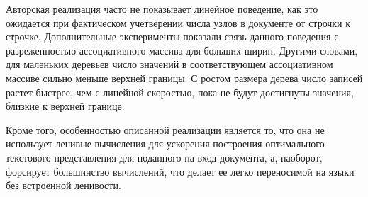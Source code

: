Авторская реализация часто не показывает линейное поведение, как это ожидается при фактическом
учетверении числа узлов в документе от строчки к строчке. Дополнительные эксперименты показали
связь данного поведения с разреженностью ассоциативного массива для больших ширин.
Другими словами, для маленьких деревьев число значений в соответствующем ассоциативном массиве
сильно меньше верхней границы. С ростом размера дерева число записей растет быстрее, чем
с линейной скоростью, пока не будут достигнуты значения, близкие к верхней границе.

Кроме того, особенностью описанной реализации является то, что она не использует 
ленивые вычисления для ускорения построения оптимального текстового представления для
поданного на вход документа, а, наоборот,
форсирует большинство вычислений, что делает ее легко переносимой на языки
без встроенной ленивости.

